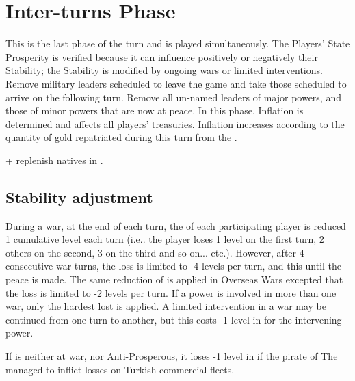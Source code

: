 \chapter{Inter-turns Phase}\label{chapter:Inter}

\InterPhase


This is the last phase of the turn and is played simultaneously.  The Players'
State Prosperity is verified because it can influence positively or negatively
their Stability; the Stability is modified by ongoing wars or limited
interventions.  Remove military leaders scheduled to leave the game and take
those scheduled to arrive on the following turn.  Remove all un-named leaders
of major powers, and those of minor powers that are now at peace.  In this
phase, Inflation is determined and affects all players' treasuries. Inflation
increases according to the quantity of gold repatriated during this turn from
the \ROTW.

\begin{todo}
  + replenish natives in \ROTW.
\end{todo}

\aparag[Sequence.]
\InterDetails



\section{Stability adjustment}\label{chInter:Stability}
During a war, at the end of each turn, the \STAB of each participating player
is reduced 1 cumulative level each turn (i.e.. the player loses 1 level on the
first turn, 2 others on the second, 3 on the third and so
on... etc.). However, after 4 consecutive war turns, the loss is limited to -4
levels per turn, and this until the peace is made.
The same reduction of \STAB is applied in Overseas Wars excepted that the loss
is limited to -2 levels per turn.
 If a power is involved in more than one war, only the
hardest lost is applied.
A limited intervention in a war may be continued from one turn to another, but
this costs -1 level in \STAB for the intervening power.

If \TUR is neither at war, nor Anti-Prosperous, it loses -1 level in \STAB if
the pirate of The  managed to inflict losses on Turkish
commercial fleets.

